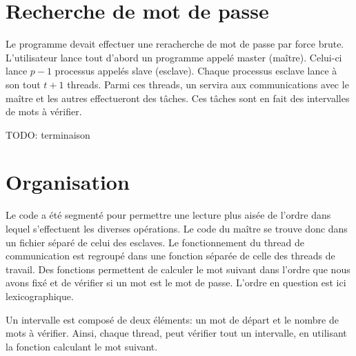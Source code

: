 \section{Recherche de mot de passe} %
\label{sec:recherche_de_mot_de_passe}

Le programme devait effectuer une reracherche de mot de passe par force brute. L'utilisateur lance tout d'abord un programme appelé master (maître). Celui-ci lance $p-1$ processus appelés slave (esclave). Chaque processus esclave lance à son tout $t+1$ threads. Parmi ces threads, un servira aux communications avec le maître et les autres effectueront des tâches. Ces tâches sont en fait des intervalles de mots à vérifier. 

TODO: terminaison

\section{Organisation} %
\label{sec:organisation}

Le code a été segmenté pour permettre une lecture plus aisée de l'ordre dans lequel s'effectuent les diverses opérations. Le code du maître se trouve donc dans un fichier séparé de celui des esclaves. Le fonctionnement du thread de communication est regroupé dans une fonction séparée de celle des threads de travail. Des fonctions permettent de calculer le mot suivant dans l'ordre que nous avons fixé et de vérifier si un mot est le mot de passe. L'ordre en question est ici lexicographique.

Un intervalle est composé de deux éléments: un mot de départ et le nombre de mots à vérifier. Ainsi, chaque thread, peut vérifier tout un intervalle, en utilisant la fonction calculant le mot suivant.

